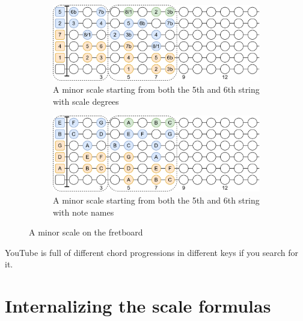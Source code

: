 \begin{figure}[h]
	\begin{subfigure}[b]{\textwidth}
		\centering
		\includegraphics[height=0.19\textheight]{../../Images/guitar_a_minor_scales_from_5_6_string_fretboard.png}
		\caption{A minor scale starting from both the 5th and 6th string with scale degrees}
		\label{fig:guitar_a_minor_scales_from_5_6_string_fretboard}
	\end{subfigure}
	
	\vspace{0.5cm}
	
	\begin{subfigure}[b]{\textwidth}
		\centering
		\includegraphics[height=0.19\textheight]{../../Images/guitar_a_minor_scales_from_5_6_string_fretboard_note_names.png}
		\caption{A minor scale starting from both the 5th and 6th string with note names}
		\label{fig:guitar_a_minor_scales_from_5_6_string_fretboard_note_names}
	\end{subfigure}
	
	\caption{A minor scale on the fretboard}
\end{figure}

YouTube is full of different chord progressions in different keys if you search for it.

\newpage

\section{Internalizing the scale formulas}

